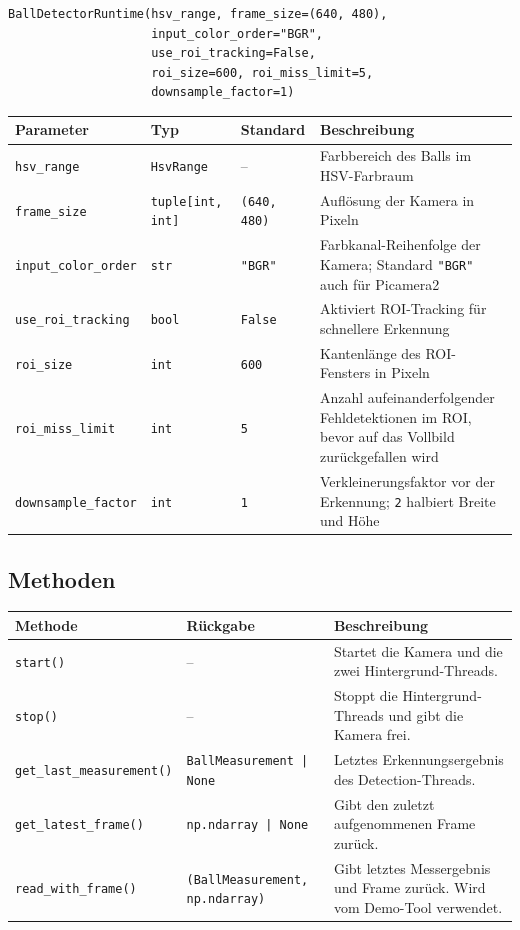 \documentclass[11pt, a4paper]{scrreprt}
\begin{document}
\begin{lstlisting}
BallDetectorRuntime(hsv_range, frame_size=(640, 480),
                    input_color_order="BGR",
                    use_roi_tracking=False,
                    roi_size=600, roi_miss_limit=5,
                    downsample_factor=1)
\end{lstlisting}

\begin{tabularx}{\textwidth}{l l l X}
  \toprule
  Parameter & Typ & Standard & Beschreibung \\
  \midrule
  \texttt{hsv\_range} & \texttt{HsvRange} & – & Farbbereich des Balls im HSV-Farbraum \\
  \texttt{frame\_size} & \texttt{tuple[int, int]} & \texttt{(640, 480)} & Auflösung der Kamera in Pixeln \\
  \texttt{input\_color\_order} & \texttt{str} & \texttt{"BGR"} & Farbkanal-Reihenfolge der Kamera; Standard \texttt{"BGR"} auch für Picamera2 \\
  \texttt{use\_roi\_tracking} & \texttt{bool} & \texttt{False} & Aktiviert ROI-Tracking für schnellere Erkennung \\
  \texttt{roi\_size} & \texttt{int} & \texttt{600} & Kantenlänge des ROI-Fensters in Pixeln \\
  \texttt{roi\_miss\_limit} & \texttt{int} & \texttt{5} & Anzahl aufeinanderfolgender Fehldetektionen im ROI, bevor auf das Vollbild zurückgefallen wird \\
  \texttt{downsample\_factor} & \texttt{int} & \texttt{1} & Verkleinerungsfaktor vor der Erkennung; \texttt{2} halbiert Breite und Höhe \\
  \bottomrule
\end{tabularx}

\subsection*{Methoden}

\begin{tabularx}{\textwidth}{l l X}
  \toprule
  Methode & Rückgabe & Beschreibung \\
  \midrule
  \texttt{start()} & – & Startet die Kamera und die zwei Hintergrund-Threads. \\
  \addlinespace
  \texttt{stop()} & – & Stoppt die Hintergrund-Threads und gibt die Kamera frei. \\
  \addlinespace
  \texttt{get\_last\_measurement()} & \texttt{BallMeasurement | None} & Letztes Erkennungsergebnis des Detection-Threads. \\
  \addlinespace
  \texttt{get\_latest\_frame()} & \texttt{np.ndarray | None} & Gibt den zuletzt aufgenommenen Frame zurück. \\
  \addlinespace
  \texttt{read\_with\_frame()} & \texttt{(BallMeasurement, np.ndarray)} & Gibt letztes Messergebnis und Frame zurück. Wird vom Demo-Tool verwendet. \\
  \bottomrule
\end{tabularx}
\end{document}
